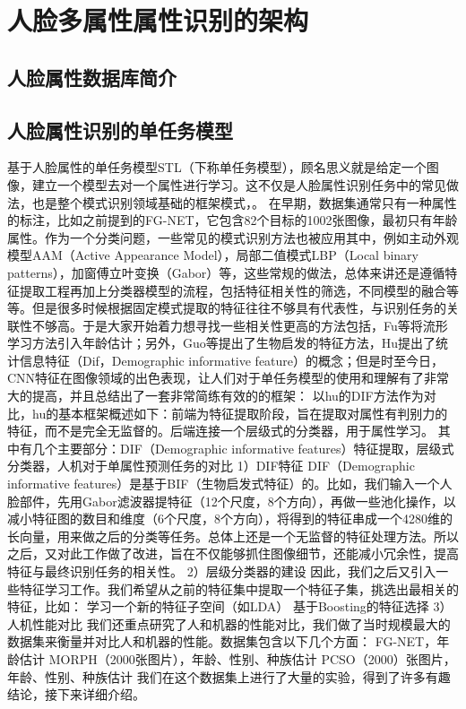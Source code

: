 \chapter{人脸多属性属性识别的架构}
\section{人脸属性数据库简介}
\section{人脸属性识别的单任务模型}
基于人脸属性的单任务模型STL（下称单任务模型），顾名思义就是给定一个图像，建立一个模型去对一个属性进行学习。这不仅是人脸属性识别任务中的常见做法，也是整个模式识别领域基础的框架模式，。
在早期，数据集通常只有一种属性的标注，比如之前提到的FG-NET，它包含82个目标的1002张图像，最初只有年龄属性。作为一个分类问题，一些常见的模式识别方法也被应用其中，例如主动外观模型AAM（Active  Appearance  Model），局部二值模式LBP（Local binary patterns），加窗傅立叶变换（Gabor）等，这些常规的做法，总体来讲还是遵循特征提取工程再加上分类器模型的流程，包括特征相关性的筛选，不同模型的融合等等。但是很多时候根据固定模式提取的特征往往不够具有代表性，与识别任务的关联性不够高。于是大家开始着力想寻找一些相关性更高的方法包括，Fu等将流形学习方法引入年龄估计；另外，Guo等提出了生物启发的特征方法，Hu提出了统计信息特征（Dif，Demographic informative feature）的概念；但是时至今日，CNN特征在图像领域的出色表现，让人们对于单任务模型的使用和理解有了非常大的提高，并且总结出了一套非常简练有效的的框架：
以hu的DIF方法作为对比，hu的基本框架概述如下：前端为特征提取阶段，旨在提取对属性有判别力的特征，而不是完全无监督的。后端连接一个层级式的分类器，用于属性学习。
其中有几个主要部分：DIF（Demographic informative features）特征提取，层级式分类器，人机对于单属性预测任务的对比
1）DIF特征
DIF（Demographic informative features）是基于BIF（生物启发式特征）的。比如，我们输入一个人脸部件，先用Gabor滤波器提特征（12个尺度，8个方向），再做一些池化操作，以减小特征图的数目和维度（6个尺度，8个方向），将得到的特征串成一个4280维的长向量，用来做之后的分类等任务。总体上还是一个无监督的特征处理方法。所以之后，又对此工作做了改进，旨在不仅能够抓住图像细节，还能减小冗余性，提高特征与最终识别任务的相关性。
2）层级分类器的建设
因此，我们之后又引入一些特征学习工作。我们希望从之前的特征集中提取一个特征子集，挑选出最相关的特征，比如：
学习一个新的特征子空间（如LDA）
基于Boosting的特征选择
3）人机性能对比
我们还重点研究了人和机器的性能对比，我们做了当时规模最大的数据集来衡量并对比人和机器的性能。数据集包含以下几个方面：
FG-NET，年龄估计
MORPH（2000张图片），年龄、性别、种族估计
PCSO（2000）张图片，年龄、性别、种族估计
我们在这个数据集上进行了大量的实验，得到了许多有趣结论，接下来详细介绍。


